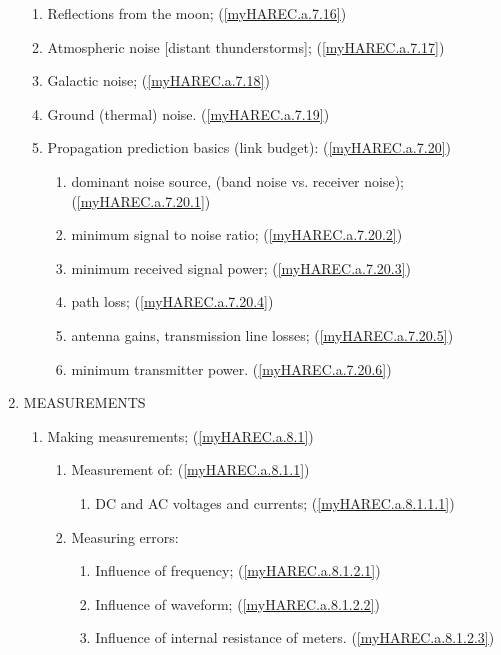 \begin{enumerate}
\begin{enumerate}[noitemsep]
\item Reflections from the moon; (\ref{myHAREC.a.7.16})\label{HAREC.a.7.16}
\item Atmospheric noise [distant thunderstorms]; (\ref{myHAREC.a.7.17})\label{HAREC.a.7.17}
\item Galactic noise; (\ref{myHAREC.a.7.18})\label{HAREC.a.7.18}
\item Ground (thermal) noise. (\ref{myHAREC.a.7.19})\label{HAREC.a.7.19}
\item Propagation prediction basics (link budget): (\ref{myHAREC.a.7.20})\label{HAREC.a.7.20}
\begin{enumerate}[noitemsep]
\item dominant noise source, (band noise vs. receiver noise); (\ref{myHAREC.a.7.20.1})\label{HAREC.a.7.20.1}
\item minimum signal to noise ratio; (\ref{myHAREC.a.7.20.2})\label{HAREC.a.7.20.2}
\item minimum received signal power; (\ref{myHAREC.a.7.20.3})\label{HAREC.a.7.20.3}
\item path loss; (\ref{myHAREC.a.7.20.4})\label{HAREC.a.7.20.4}
\item antenna gains, transmission line losses; (\ref{myHAREC.a.7.20.5})\label{HAREC.a.7.20.5}
\item minimum transmitter power. (\ref{myHAREC.a.7.20.6})\label{HAREC.a.7.20.6}
\end{enumerate}
\end{enumerate}
\item MEASUREMENTS
\begin{enumerate}[noitemsep]
\item Making measurements; (\ref{myHAREC.a.8.1})\label{HAREC.a.8.1}
\begin{enumerate}[noitemsep]
\item Measurement of: (\ref{myHAREC.a.8.1.1})\label{HAREC.a.8.1.1}
\begin{enumerate}[noitemsep]
\item DC and AC voltages and currents; (\ref{myHAREC.a.8.1.1.1})\label{HAREC.a.8.1.1.1}
\end{enumerate}
\item Measuring errors:
\begin{enumerate}[noitemsep]
\item Influence of frequency; (\ref{myHAREC.a.8.1.2.1})\label{HAREC.a.8.1.2.1}
\item Influence of waveform; (\ref{myHAREC.a.8.1.2.2})\label{HAREC.a.8.1.2.2}
\item Influence of internal resistance of meters. (\ref{myHAREC.a.8.1.2.3})\label{HAREC.a.8.1.2.3}

\end{enumerate}
\end{enumerate}
\end{enumerate}
\end{enumerate}
